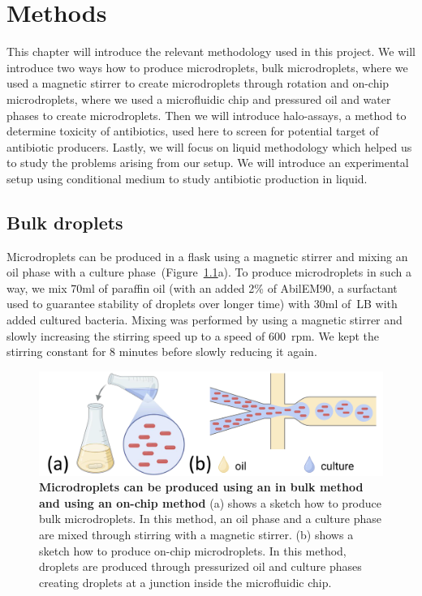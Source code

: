 \chapter{Methods}

This chapter will introduce the relevant methodology used in this project. We will introduce two ways how to produce microdroplets, bulk microdroplets, where we used a magnetic stirrer to create microdroplets through rotation and on-chip microdroplets, where we used a microfluidic chip and pressured oil and water phases to create microdroplets. Then we will introduce halo-assays, a method to determine toxicity of antibiotics, used here to screen for potential target of antibiotic producers. Lastly, we will focus on liquid methodology which helped us to study the problems arising from our setup. We will introduce an experimental setup using conditional medium to study antibiotic production in liquid.

\section{Bulk droplets}
\label{sec:method_bulk_droplets}
Microdroplets can be produced in a flask using a magnetic stirrer and mixing an oil phase with a culture phase~(Figure~\ref{fig:method_droplet_experiments}a). To produce microdroplets in such a way, we mix 70ml of paraffin oil (with an added 2\% of AbilEM90, a surfactant used to guarantee stability of droplets over longer time) with 30ml of~\gls{LB} with added cultured bacteria. Mixing was performed by using a magnetic stirrer and slowly increasing the stirring speed up to a speed of 600~\gls{rpm}. We kept the stirring constant for 8 minutes before slowly reducing it again. 
\begin{figure}
\centering
\includegraphics[width=\linewidth]{graphics/2025_09_30_droplets_fig2.png}
\caption{\textbf{Microdroplets can be produced using an in bulk method and using an on-chip method} (a) shows a sketch how to produce bulk microdroplets. In this method, an oil phase and a culture phase are mixed through stirring with a magnetic stirrer. (b) shows a sketch how to produce on-chip microdroplets. In this method, droplets are produced through pressurized oil and culture phases creating droplets at a junction inside the microfluidic chip.}
\label{fig:method_droplet_experiments}
\end{figure}

